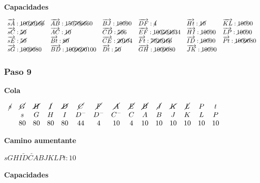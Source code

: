 \documentclass[10pt,a4paper]{article}
\begin{document}
\textbf{Capacidades}

$\begin{array}{llllll} \overrightarrow{sA}: \cancel{100}\cancel{20}\cancel{16}\cancel{6}& \overrightarrow{AB}: \cancel{150} \cancel{70}\cancel{66}60&\overrightarrow{BJ}: \cancel{100}90& \overrightarrow{DF}: \cancel{4}&\overrightarrow{Ht}: \cancel{10}&\overrightarrow{KL}: \cancel{100}90\\ \overrightarrow{sC}: \cancel{50}& \overrightarrow{AC}: \cancel{10}&\overrightarrow{CD}: \cancel{50}6&\overrightarrow{EF}: \cancel{100}\cancel{50}\cancel{40}34&\overrightarrow{HI}: \cancel{100}90&\overrightarrow{LP}: \cancel{100}90\\ \overrightarrow{sE}: \cancel{50}& \overrightarrow{Bt}: \cancel{80}&\overrightarrow{CE}: \cancel{20}\cancel{10}4 &\overrightarrow{Ft}: \cancel{70}\cancel{20}\cancel{16}\cancel{6}&\overrightarrow{ID}: \cancel{100}90&\overrightarrow{Pt}: \cancel{100}\cancel{90}80\\ \overrightarrow{sG}: \cancel{100}\cancel{90}80& \overrightarrow{BD}: \cancel{100}\cancel{96}\cancel{90}100&\overrightarrow{Dt}: \cancel{50}&\overrightarrow{GH}: \cancel{100}\cancel{90}80&\overrightarrow{JK}: \cancel{100}90&\\ \end{array}$

\subsubsection*{Paso 9}

\textbf{Cola}

\textbf{$\begin{array}{ccccccccccccccc} \cancel{s} & \cancel{G} & \cancel{H} & \cancel{I} & \cancel{D}& \cancel{C } &\cancel{F} & \cancel{A} & \cancel{E} & \cancel{B} & \cancel{J} & \cancel{K} & \cancel{L} &P & t\\ & s & G & H & I & D^- &D^-& C^- & C &A & B &J &K &L &P\\ & 80 & 80 & 80 & 80 & 44& 4 & 10 & 4 & 10 & 10& 10 & 10 & 10 & 10 \end{array}$}

\textbf{Camino aumentante}

\textbf{$sGHI\overleftarrow{D}\overleftarrow{CA}BJKLPt:10$}

\textbf{Capacidades}
\end{document}
